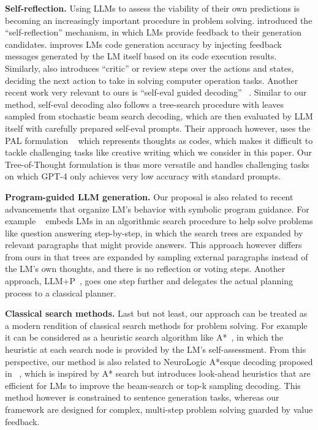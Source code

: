 \documentclass{article}
\begin{document}
\textbf{Self-reflection.} Using LLMs to assess the viability of their own predictions is becoming an increasingly important procedure in problem solving. \citep{shinn2023reflexion,madaan2023selfrefine,paul2023refiner} introduced the ``self-reflection'' mechanism, in which LMs provide feedback to their generation candidates. \citep{chen2023teaching} improves LMs code generation accuracy by injecting feedback messages generated by the LM itself based on its code execution results. Similarly, \citep{kim2023language} also introduces ``critic'' or review steps over the actions and states,  deciding the next action to take in solving computer operation tasks. Another recent work very relevant to ours is ``self-eval guided decoding'' ~\citep{xie2023decomposition}. Similar to our method, self-eval decoding also follows a tree-search procedure with leaves sampled from stochastic beam search decoding, which are then evaluated by LLM itself with carefully prepared self-eval prompts. Their approach however, uses the PAL formulation ~\citep{gao2023pal} which represents thoughts as codes, which makes it difficult to tackle challenging tasks like creative writing which we consider in this paper. Our Tree-of-Thought formulation is thus more versatile and handles challenging tasks on which GPT-4 only achieves very low accuracy with standard prompts.

\textbf{Program-guided LLM generation.} Our proposal is also related to recent advancements that organize LM's behavior with symbolic program guidance. For example ~\citep{schlag2023large} embeds LMs in an algorithmic search procedure to help solve problems like question answering step-by-step, in which the search trees are expanded by relevant paragraphs that might provide answers. This approach however differs from ours in that trees are expanded by sampling external paragraphs instead of the LM's own thoughts, and there is no reflection or voting steps. Another approach, LLM+P~\citep{liu2023llmp}, goes one step further and delegates the actual planning process to a classical planner.

\textbf{Classical search methods.} Last but not least, our approach can be treated as a modern rendition of classical search methods for problem solving. For example it can be considered as a heuristic search algorithm like A*~\citep{a-star}, in which the heuristic at each search node is provided by the LM's self-assessment. From this perspective, our method is also related to NeuroLogic A*esque decoding proposed in ~\citep{Lu2021NeuroLogicAD}, which is inspired by A* search but introduces look-ahead heuristics that are efficient for LMs to improve the beam-search or top-k sampling decoding. This method however is constrained to sentence generation tasks, whereas our framework are designed for complex, multi-step problem solving guarded by value feedback.
\end{document}
